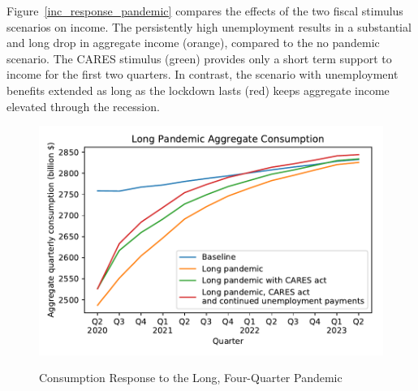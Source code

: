 \documentclass[titlepage]{\econtex}
\begin{document}
Figure~\ref{inc_response_pandemic} compares the effects of the two fiscal stimulus scenarios on income. 
The persistently high unemployment results in a substantial and long drop in aggregate income (orange), compared to the no pandemic scenario. 
The CARES stimulus (green) provides only a short term support to income for the first two quarters. 
In contrast, the scenario with unemployment benefits extended as long as the lockdown lasts (red) keeps aggregate income elevated through the recession.

\begin{figure}
  \centering
  \caption{Consumption Response to the Long, Four-Quarter Pandemic}
  \label{cons_response_pandemic}
  { \includegraphics[width=8in]{./Figures/DeepPandemic}}
\end{figure}
\end{document}
